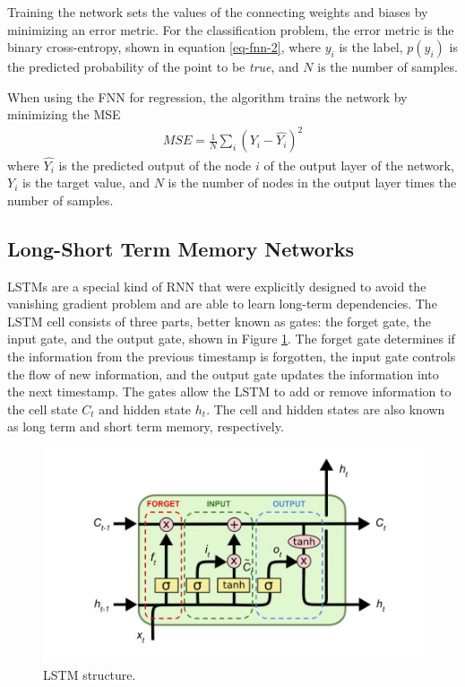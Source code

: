 Training the network sets the values of the connecting weights and biases by minimizing an error metric.
For the classification problem, the error metric is the binary cross-entropy, shown in equation \ref{eq-fnn-2}, where $y_i$ is the label, $p(y_i)$ is the predicted probability of the point to be \textit{true}, and $N$ is the number of samples.

When using the FNN for regression, the algorithm trains the network by minimizing the MSE
\begin{align}
MSE = \frac{1}{N} \sum_i (Y_i - \hat{Y_i})^2 \label{eq-MSE}
\end{align}
where $\hat{Y_i}$ is the predicted output of the node $i$ of the output layer of the network, $Y_i$ is the target value, and $N$ is the number of nodes in the output layer times the number of samples.


\subsection{Long-Short Term Memory Networks}


LSTMs are a special kind of RNN that were explicitly designed to avoid the vanishing gradient problem and are able to learn long-term dependencies.
The LSTM cell consists of three parts, better known as gates: the forget gate, the input gate, and the output gate, shown in Figure \ref{fig:lstm}.
The forget gate determines if the information from the previous timestamp is forgotten, the input gate controls the flow of new information, and the output gate updates the information into the next timestamp.
The gates allow the LSTM to add or remove information to the cell state $C_t$ and hidden state $h_t$.
The cell and hidden states are also known as long term and short term memory, respectively.

\begin{figure}[htbp!] %
  \centering
  \includegraphics[width=0.5\linewidth]{figures/lstm}
  \caption{LSTM structure.}
  \label{fig:lstm}
\end{figure}

